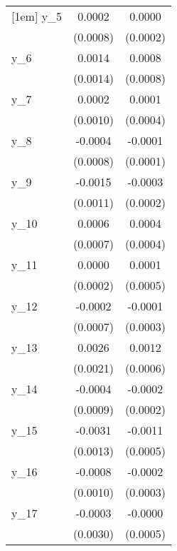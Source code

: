 {\begin{tabular}{l*{2}{c}}
[1em]
y\_5         &      0.0002        &      0.0000        \\
            &    (0.0008)        &    (0.0002)        \\
[1em]
y\_6         &      0.0014        &      0.0008        \\
            &    (0.0014)        &    (0.0008)        \\
[1em]
y\_7         &      0.0002        &      0.0001        \\
            &    (0.0010)        &    (0.0004)        \\
[1em]
y\_8         &     -0.0004        &     -0.0001        \\
            &    (0.0008)        &    (0.0001)        \\
[1em]
y\_9         &     -0.0015        &     -0.0003        \\
            &    (0.0011)        &    (0.0002)        \\
[1em]
y\_10        &      0.0006        &      0.0004        \\
            &    (0.0007)        &    (0.0004)        \\
[1em]
y\_11        &      0.0000        &      0.0001        \\
            &    (0.0002)        &    (0.0005)        \\
[1em]
y\_12        &     -0.0002        &     -0.0001        \\
            &    (0.0007)        &    (0.0003)        \\
[1em]
y\_13        &      0.0026        &      0.0012\sym{*} \\
            &    (0.0021)        &    (0.0006)        \\
[1em]
y\_14        &     -0.0004        &     -0.0002        \\
            &    (0.0009)        &    (0.0002)        \\
[1em]
y\_15        &     -0.0031\sym{**}&     -0.0011\sym{**}\\
            &    (0.0013)        &    (0.0005)        \\
[1em]
y\_16        &     -0.0008        &     -0.0002        \\
            &    (0.0010)        &    (0.0003)        \\
[1em]
y\_17        &     -0.0003        &     -0.0000        \\
            &    (0.0030)        &    (0.0005)        \\

\end{tabular}}
